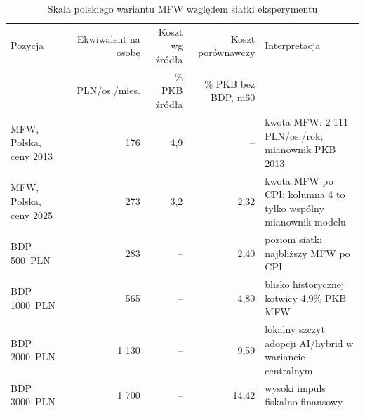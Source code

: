 \begin{table}[htbp]
\centering
\scriptsize
\caption{Skala polskiego wariantu MFW względem siatki eksperymentu \amor{}}
\label{tab:mfw-scale-bridge}
\begin{tabularx}{\textwidth}{@{}p{}rrrX@{}}
\toprule
Pozycja & Ekwiwalent na osobę & Koszt wg źródła & Koszt porównawczy & Interpretacja \\
 & PLN/os./mies. & \% PKB źródła & \% PKB bez BDP, m60 & \\
\midrule
MFW, Polska, ceny 2013 & 176 & 4,9 & -- & kwota MFW: 2 111 PLN/os./rok; mianownik PKB 2013 \\
MFW, Polska, ceny 2025 & 273 & 3,2 & 2,32 & kwota MFW po CPI; kolumna 4 to tylko wspólny mianownik modelu \\
BDP 500~PLN & 283 & -- & 2,40 & poziom siatki najbliższy MFW po CPI \\
BDP 1000~PLN & 565 & -- & 4,80 & blisko historycznej kotwicy 4,9\% PKB MFW \\
BDP 2000~PLN & 1 130 & -- & 9,59 & lokalny szczyt adopcji AI/hybrid w wariancie centralnym \\
BDP 3000~PLN & 1 700 & -- & 14,42 & wysoki impuls fiskalno-finansowy \\
\bottomrule
\end{tabularx}
\end{table}
